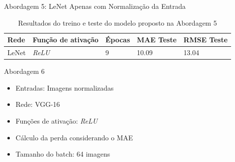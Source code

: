 \begin{frame}{\large{Abordagem 5: LeNet Apenas com Normalização da Entrada}}
  \begin{table}[!ht]
		\caption{Resultados do treino e teste do modelo proposto na Abordagem 5}
		\label{tab:results-1}
		\begin{center}
			\begin{tabular}{l l l l l}
				\toprule
				Rede & Função de ativação & Épocas & MAE Teste & RMSE Teste \\
				\midrule
        LeNet & \emph{ReLU} & 9 &  10.09 & 13.04 \\
				\bottomrule
			\end{tabular}
		\end{center}
	\end{table}
\end{frame}



\begin{frame}{\large{Abordagem 6}}
 \begin{itemize}
   \item Entradas: Imagens normalizadas
   \item Rede: \alert{VGG-16}
   \item Funções de ativação: \emph{ReLU}
   \ \ \newline
   \item Cálculo da perda considerando o MAE
   \item \alert{Tamanho do batch: 64 imagens}
   \end{itemize}
\end{frame}

